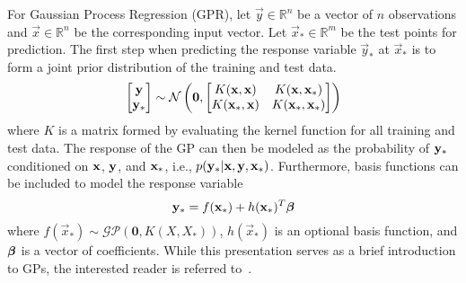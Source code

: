For Gaussian Process Regression (GPR), let $ \vec{y} \in \mathbb{R}^n $ be a vector of $ n $ observations and $ \vec{x} \in \mathbb{R}^n  $ be the corresponding input vector. Let $ \vec{x}_{*} \in \mathbb{R}^m$ be the test points for prediction. The first step when predicting the response variable $ \vec{y}_{*} $ at $ \vec{x}_{*} $ is to form a joint prior distribution of the training and test data. 
\[
	\begin{bmatrix}
		\y \\
		\y_{*}
	\end{bmatrix} \sim \mathcal{N} \left(\mathbf{0},%
	\begin{bmatrix}
		K(\x,\x) & K(\x,\x_{*}) \\
		K(\x_{*},\x) & K(\x_{*},\x_{*})
	\end{bmatrix}\right)
\]
where $ K $ is a matrix formed by evaluating the kernel function for all training and test data. The response of the GP can then be modeled as the probability of $ \mathbf{y}_{*} $ conditioned on $ \mathbf{x} $, $ \mathbf{y} $, and $ \mathbf{x}_{*} $, i.e., $ p(\mathbf{y}_{*}|\mathbf{x},\mathbf{y},\mathbf{x}_{*}) $. Furthermore, basis functions can be included to model the response variable
\[
	\mathbf{y}_{*} = f(\mathbf{x}_{*}) + h(\mathbf{x}_{*})^T \boldsymbol{\beta}
\]
where $ f(\vec{x}_{*}) \sim \mathcal{GP}(\mathbf{0},K(X,X_{*})) $, $ h(\vec{x}_*) $ is an optional basis function, and $ \boldsymbol{\beta} $ is a vector of coefficients. While this presentation serves as a brief introduction to GPs, the interested reader is referred to~\cite{rasmussen2006gaussian}.

